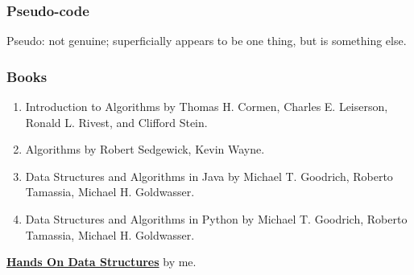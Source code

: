 \documentclass[aspectratio=169, 14pt]{beamer}
\begin{document}
\begin{frame}[fragile]
	\frametitle{Pseudo-code}
	Pseudo: not genuine; superficially appears to be one thing, but is something else.

\end{frame}

\begin{frame}
	\frametitle{Books}
	\begin{enumerate}
		\item \alert{Introduction to Algorithms} by Thomas H. Cormen, Charles E. Leiserson, Ronald L. Rivest, and Clifford Stein.
		\item \alert{Algorithms} by Robert Sedgewick, Kevin Wayne.
		\item \alert{Data Structures and Algorithms in Java} by Michael T. Goodrich, Roberto Tamassia, Michael H. Goldwasser.
		\item \alert{Data Structures and Algorithms in Python} by Michael T. Goodrich, Roberto Tamassia, Michael H. Goldwasser.
	\end{enumerate}
	\textbf{\href{https://chenzhongpu.github.io/data-structure-swufe/}{Hands On Data Structures}} by me.
\end{frame}
\end{document}

